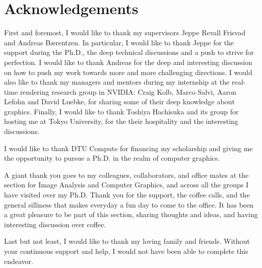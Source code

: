 \chapter{Acknowledgements}

First and foremost, I would like to thank my supervisors Jeppe Revall Frisvad and Andreas B\ae rentzen. In particular, I would like to thank Jeppe for the support during the Ph.D., the deep technical discussions and a push to strive for perfection. I would like to thank Andreas for the deep and interesting discussion on how to push my work towards more and more challenging directions. I would also like to thank my managers and mentors during my internship at the real-time rendering research group in NVIDIA: Craig Kolb, Marco Salvi, Aaron Lefohn and David Luebke, for sharing some of their deep knowledge about graphics. Finally, I would like to thank Toshiya Hachisuka and its group for hosting me at Tokyo University, for the their hospitality and the interesting discussions.

I would like to thank DTU Compute for financing my scholarship and giving me the opportunity to pursue a Ph.D. in the realm of computer graphics.

A giant thank you goes to my colleagues, collaborators, and office mates at the section for Image Analysis and Computer Graphics, and across all the groups I have visited over my Ph.D. Thank you for the support, the coffee calls, and the general silliness that makes everyday a fun day to come to the office. It has been a great pleasure to be part of this section, sharing thoughts and ideas, and having interesting discussion over  coffee.

Last but not least, I would like to thank my loving family and friends. Without your continuous support and help, I would not have been able to complete this endeavor. 